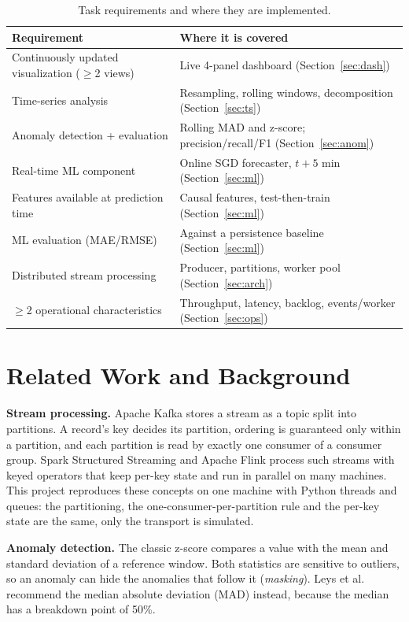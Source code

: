 \documentclass[11pt]{article}
\begin{document}
\begin{table}[H]
\centering\small
\begin{tabular}{@{}ll@{}}
\toprule
Requirement & Where it is covered \\
\midrule
Continuously updated visualization ($\ge$2 views) & Live 4-panel dashboard (Section~\ref{sec:dash}) \\
Time-series analysis & Resampling, rolling windows, decomposition (Section~\ref{sec:ts}) \\
Anomaly detection + evaluation & Rolling MAD and z-score; precision/recall/F1 (Section~\ref{sec:anom}) \\
Real-time ML component & Online SGD forecaster, $t+5$ min (Section~\ref{sec:ml}) \\
Features available at prediction time & Causal features, test-then-train (Section~\ref{sec:ml}) \\
ML evaluation (MAE/RMSE) & Against a persistence baseline (Section~\ref{sec:ml}) \\
Distributed stream processing & Producer, partitions, worker pool (Section~\ref{sec:arch}) \\
$\ge$2 operational characteristics & Throughput, latency, backlog, events/worker (Section~\ref{sec:ops}) \\
\bottomrule
\end{tabular}
\caption{Task requirements and where they are implemented.}
\label{tab:req}
\end{table}

\section{Related Work and Background}
\textbf{Stream processing.} Apache Kafka \cite{kafka} stores a stream as a topic split into partitions. A record's key decides its partition, ordering is guaranteed only within a partition, and each partition is read by exactly one consumer of a consumer group. Spark Structured Streaming \cite{spark} and Apache Flink \cite{flink} process such streams with keyed operators that keep per-key state and run in parallel on many machines. This project reproduces these concepts on one machine with Python threads and queues: the partitioning, the one-consumer-per-partition rule and the per-key state are the same, only the transport is simulated.

\textbf{Anomaly detection.} The classic z-score compares a value with the mean and standard deviation of a reference window. Both statistics are sensitive to outliers, so an anomaly can hide the anomalies that follow it (\emph{masking}). Leys et al.\ \cite{leys} recommend the median absolute deviation (MAD) instead, because the median has a breakdown point of 50\%.
\end{document}
